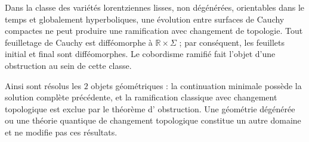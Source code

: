 \begin{theorem}
\label{thm:ivv-cobordism-obstruction}
Dans la classe des variétés lorentziennes lisses, non dégénérées, orientables dans
le temps et globalement hyperboliques, une évolution entre surfaces de
Cauchy compactes ne peut produire une ramification avec changement de topologie.
Tout feuilletage de Cauchy est difféomorphe à \(\mathbb R\times\Sigma\) ; par conséquent,
les feuillets initial et final sont difféomorphes. Le cobordisme ramifié fait l'objet d'une
obstruction au sein de cette classe.
\end{theorem}

Ainsi sont résolus les \(2\) objets géométriques : la continuation minimale
possède la solution complète précédente, et
la ramification classique avec changement topologique est exclue par le théorème d'
obstruction. Une géométrie dégénérée ou une théorie quantique de changement
topologique constitue un autre domaine et ne modifie pas ces résultats.
